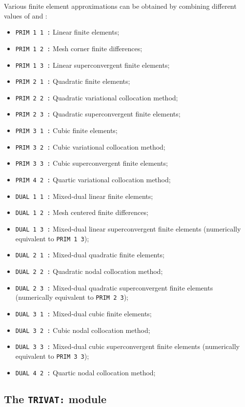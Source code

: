 Various finite element approximations can be obtained by combining different values of  and :
\begin{itemize}
\item {\tt PRIM 1 1~:} Linear finite elements;
\item {\tt PRIM 1 2~:} Mesh corner finite differences;
\item {\tt PRIM 1 3~:} Linear superconvergent finite elements;
\item {\tt PRIM 2 1~:} Quadratic finite elements;
\item {\tt PRIM 2 2~:} Quadratic variational collocation method;
\item {\tt PRIM 2 3~:} Quadratic superconvergent finite elements;
\item {\tt PRIM 3 1~:} Cubic finite elements;
\item {\tt PRIM 3 2~:} Cubic variational collocation method;
\item {\tt PRIM 3 3~:} Cubic superconvergent finite elements;
\item {\tt PRIM 4 2~:} Quartic variational collocation method;
\item {\tt DUAL 1 1~:} Mixed-dual linear finite elements;
\item {\tt DUAL 1 2~:} Mesh centered finite differences;
\item {\tt DUAL 1 3~:} Mixed-dual linear superconvergent finite elements (numerically equivalent to {\tt PRIM~1~3});
\item {\tt DUAL 2 1~:} Mixed-dual quadratic finite elements;
\item {\tt DUAL 2 2~:} Quadratic nodal collocation method;
\item {\tt DUAL 2 3~:} Mixed-dual quadratic superconvergent finite elements (numerically equivalent to {\tt PRIM~2~3});
\item {\tt DUAL 3 1~:} Mixed-dual cubic finite elements;
\item {\tt DUAL 3 2~:} Cubic nodal collocation method;
\item {\tt DUAL 3 3~:} Mixed-dual cubic superconvergent finite elements (numerically equivalent to {\tt PRIM~3~3});
\item {\tt DUAL 4 2~:} Quartic nodal collocation method;
\end{itemize}
\clearpage

\subsection{The {\tt TRIVAT:} module}

